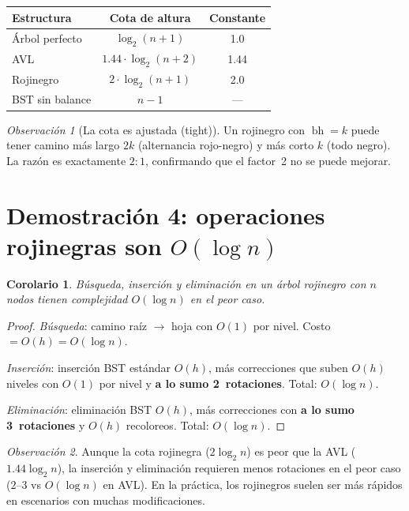 \documentclass[11pt, letterpaper]{article}
\theoremstyle{definition}
\theoremstyle{plain}
\newtheorem{corollary}[theorem]{Corolario}
\theoremstyle{remark}
\newtheorem{remark}{Observación}[section]
\begin{document}
\begin{table}[h]
\centering
\begin{tabular}{lcc}
\toprule
\textbf{Estructura} & \textbf{Cota de altura} & \textbf{Constante} \\
\midrule
Árbol perfecto     & $\log_2(n{+}1)$          & 1.0  \\
AVL                & $1.44 \cdot \log_2(n{+}2)$ & 1.44 \\
Rojinegro          & $2 \cdot \log_2(n{+}1)$    & 2.0  \\
BST sin balance    & $n - 1$                   & ---  \\
\bottomrule
\end{tabular}
\end{table}

\begin{remark}[La cota es ajustada (tight)]
Un rojinegro con $\operatorname{bh} = k$ puede tener camino más largo
$2k$ (alternancia rojo-negro) y más corto $k$ (todo negro). La razón
es exactamente $2{:}1$, confirmando que el factor~2 no se puede mejorar.
\end{remark}

\section{Demostración 4: operaciones rojinegras son
  \texorpdfstring{$O(\log n)$}{O(log n)}}

\begin{corollary}\label{cor:ops}
Búsqueda, inserción y eliminación en un árbol rojinegro con $n$ nodos
tienen complejidad $O(\log n)$ en el peor caso.
\end{corollary}

\begin{proof}
\emph{Búsqueda}: camino raíz $\to$ hoja con $O(1)$ por nivel.
Costo $= O(h) = O(\log n)$. \checkmark

\emph{Inserción}: inserción BST estándar $O(h)$, más correcciones
que suben $O(h)$ niveles con $O(1)$ por nivel y \textbf{a lo sumo
2~rotaciones}. Total: $O(\log n)$. \checkmark

\emph{Eliminación}: eliminación BST $O(h)$, más correcciones con
\textbf{a lo sumo 3~rotaciones} y $O(h)$ recoloreos.
Total: $O(\log n)$. \checkmark
\end{proof}

\begin{remark}
Aunque la cota rojinegra ($2\log_2 n$) es peor que la AVL
($1.44\log_2 n$), la inserción y eliminación requieren menos
rotaciones en el peor caso ($2$--$3$ vs $O(\log n)$ en AVL). En la
práctica, los rojinegros suelen ser más rápidos en escenarios con
muchas modificaciones.
\end{remark}
\end{document}
